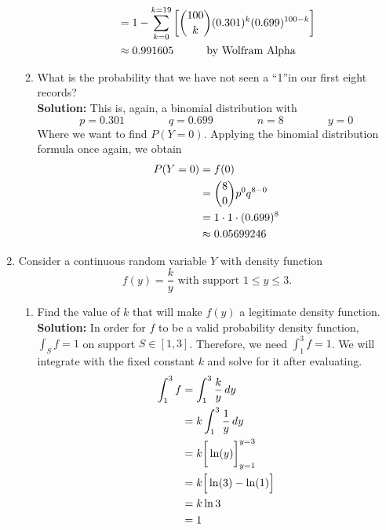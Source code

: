 \documentclass[12pt]{article}
\newcommand{\brac}[1]{\left[ {#1} \right] }
\renewcommand{\over}[1]{\frac{1}{{#1}}}
\begin{document}
\begin{enumerate}
\begin{enumerate}
\begin{align}
            &= 1 - \sum_{k=0}^{k=19} \brac{\binom{100}{k}(0.301)^k (0.699)^{100-k}} \notag\\
            &\approx 0.991605  \qquad\quad\text{by Wolfram Alpha}\notag
        \end{align}
        \vspace{0.15in}
        \item What is the probability that we have not seen a \textquotedblleft 1\textquotedblright \text{ }in our first eight records? \vspace{0.15in}\\
        \textbf{Solution:} This is, again, a binomial distribution with
        $$p = 0.301 \qquad\qquad q = 0.699 \qquad\qquad n = 8 \qquad\qquad y = 0$$
        Where we want to find $P(Y = 0)$. Applying the binomial distribution formula once again, we obtain
        \begin{align}
            P(Y = 0) &= f(0) \notag\\
            &= \binom{8}{0}p^0 q^{8-0} \notag\\
            &= 1 \cdot 1 \cdot (0.699)^8 \notag\\
            &\approx 0.05699246 \notag
        \end{align}
    \end{enumerate}
    \newpage
    \item Consider a continuous random variable $Y$ with density function
    $$f(y)=\frac{k}{y} \text { with support } 1 \leq y \leq 3 .$$
    \begin{enumerate}
        \item Find the value of $k$ that will make $f(y)$ a legitimate density function.
        \vspace{0.15in}\\
        \textbf{Solution:} In order for $f$ to be a valid probability density function, $\int_S f = 1$ on support $S \in [1,3]$. Therefore, we need $\int_1^3 f = 1$. We will integrate with the fixed constant $k$ and solve for it after evaluating.
        \begin{align}
            \int_1^3 f &= \int_1^3 \frac{k}{y}\,dy \notag\\
            &= k \int_1^3 \over{y}\,dy\notag\\
            &= k \bigg[ \ln(y) \bigg]_{y=1}^{y=3} \notag\\
            &= k \Big[ \ln(3) - \ln(1) \Big] \notag\\
            &= k\ln3 \notag \\ &= 1 \notag

\end{align}
\end{enumerate}
\end{enumerate}
\end{document}
